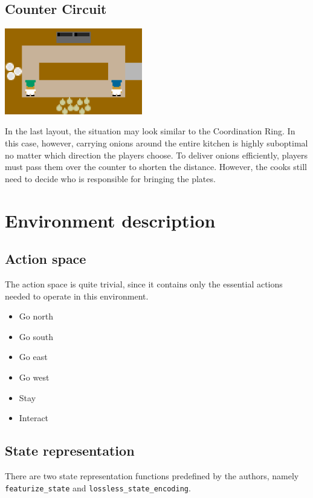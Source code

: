 \subsection*{Counter Circuit}
\begin{center}
    \includegraphics*[width=6cm]{../img/counter_circuit_layout.png}
\end{center}
In the last layout, the situation may look similar to the Coordination Ring. In this case, however, carrying onions around the entire kitchen is highly suboptimal no matter which direction the players choose. 
To deliver onions efficiently, players must pass them over the counter to shorten the distance. 
However, the cooks still need to decide who is responsible for bringing the plates.


\section{Environment description}
\subsection{Action space}
The action space is quite trivial, since it contains only the essential actions needed to operate in this environment.
\begin{itemize}
    \item Go north
    \item Go south
    \item Go east
    \item Go west
    \item Stay
    \item Interact
\end{itemize}

\subsection{State representation}\label{StateRepresentation}
There are two state representation functions predefined by the authors, namely \texttt{featurize\_state} and \texttt{lossless\_state\_encoding}.

